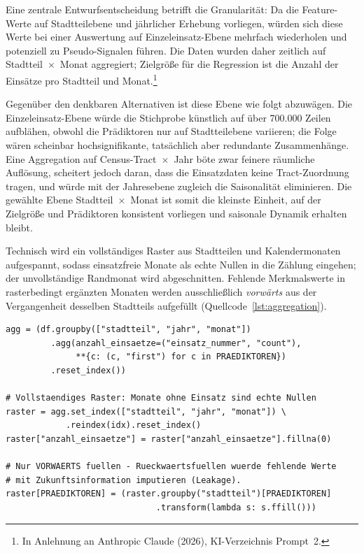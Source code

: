 Eine zentrale Entwurfsentscheidung betrifft die Granularität: Da die
Feature-Werte auf Stadtteilebene und jährlicher Erhebung vorliegen, würden
sich diese Werte bei einer Auswertung auf Einzeleinsatz-Ebene mehrfach
wiederholen und potenziell zu Pseudo-Signalen führen. Die Daten wurden daher
zeitlich auf Stadtteil~$\times$~Monat aggregiert; Zielgröße für die
Regression ist die Anzahl der Einsätze pro Stadtteil und
Monat.\footnote{In Anlehnung an Anthropic Claude (2026), KI-Verzeichnis
Prompt~2.}

Gegenüber den denkbaren Alternativen ist diese Ebene wie folgt abzuwägen. Die
Einzeleinsatz-Ebene würde die Stichprobe künstlich auf über 700.000 Zeilen
aufblähen, obwohl die Prädiktoren nur auf Stadtteilebene variieren; die
Folge wären scheinbar hochsignifikante, tatsächlich aber redundante
Zusammenhänge. Eine Aggregation auf Census-Tract~$\times$~Jahr böte zwar
feinere räumliche Auflösung, scheitert jedoch daran, dass die Einsatzdaten
keine Tract-Zuordnung tragen, und würde mit der Jahresebene zugleich die
Saisonalität eliminieren. Die gewählte Ebene Stadtteil~$\times$~Monat ist
somit die kleinste Einheit, auf der Zielgröße und Prädiktoren konsistent
vorliegen und saisonale Dynamik erhalten bleibt.

Technisch wird ein vollständiges Raster aus Stadtteilen und Kalendermonaten
aufgespannt, sodass einsatzfreie Monate als echte Nullen in die Zählung
eingehen; der unvollständige Randmonat wird abgeschnitten. Fehlende
Merkmalswerte in rasterbedingt ergänzten Monaten werden ausschließlich
\emph{vorwärts} aus der Vergangenheit desselben Stadtteils aufgefüllt
(Quellcode~\ref{lst:aggregation}).

\begin{lstlisting}[caption={Aggregation auf Stadtteil~$\times$~Monat mit
vollständigem Raster (Ausschnitt aus
\texttt{modellierung/aggregation.py})}, label=lst:aggregation]
agg = (df.groupby(["stadtteil", "jahr", "monat"])
         .agg(anzahl_einsaetze=("einsatz_nummer", "count"),
              **{c: (c, "first") for c in PRAEDIKTOREN})
         .reset_index())

# Vollstaendiges Raster: Monate ohne Einsatz sind echte Nullen
raster = agg.set_index(["stadtteil", "jahr", "monat"]) \
            .reindex(idx).reset_index()
raster["anzahl_einsaetze"] = raster["anzahl_einsaetze"].fillna(0)

# Nur VORWAERTS fuellen - Rueckwaertsfuellen wuerde fehlende Werte
# mit Zukunftsinformation imputieren (Leakage).
raster[PRAEDIKTOREN] = (raster.groupby("stadtteil")[PRAEDIKTOREN]
                              .transform(lambda s: s.ffill()))
\end{lstlisting}

